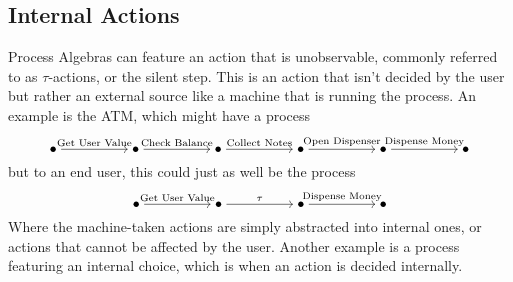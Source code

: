 \documentclass[../hons_project.tex]{subfiles}
\begin{document}
\subsection{Internal Actions}\label{ssec:internal-actions}
Process Algebras can feature an action that is unobservable, commonly referred to as $\tau$-actions, or the silent step. This is an action that isn't decided by the user but rather an external source like a machine that is running the process. An example is the ATM, which might have a process 
\[\begin{tikzcd}[cramped]
	\bullet && \bullet && \bullet && \bullet && \bullet && \bullet
	\arrow["{\text{Get User Value}}", from=1-1, to=1-3]
	\arrow["{\text{Check Balance}}", from=1-3, to=1-5]
	\arrow["{\text{Collect Notes}}", from=1-5, to=1-7]
	\arrow["{\text{Open Dispenser}}", from=1-7, to=1-9]
	\arrow["{\text{Dispense Money}}", from=1-9, to=1-11]
\end{tikzcd}\]
but to an end user, this could just as well be the process
\[\begin{tikzcd}[cramped]
	\bullet && \bullet && \bullet && \bullet
	\arrow["{\text{Get User Value}}", from=1-1, to=1-3]
	\arrow["\tau", from=1-3, to=1-5]
	\arrow["{\text{Dispense Money}}", from=1-5, to=1-7]
\end{tikzcd}\]
Where the machine-taken actions are simply abstracted into internal ones, or actions that cannot be affected by the user. Another example is a process featuring an internal choice, which is when an action is decided internally. 
\end{document}
